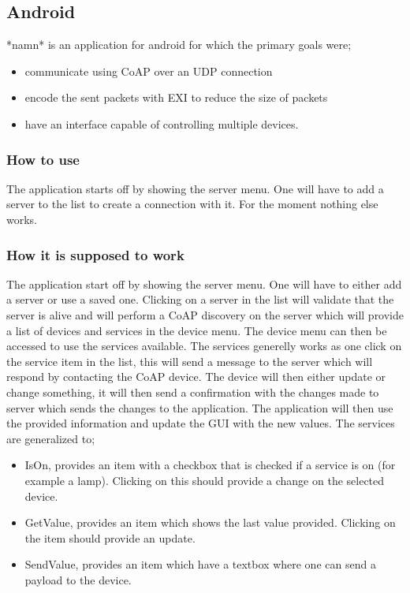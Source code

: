 \subsection{Android}
*namn* is an application for android for which the primary goals were;
\begin{itemize}
 \item communicate using CoAP over an UDP connection
 \item encode the sent packets with EXI to reduce the size of packets
 \item have an interface capable of controlling multiple devices.
\end{itemize}


\subsubsection{How to use}
The application starts off by showing the server menu. One will have to add a server to the list to create a connection with it. For the moment nothing else works.

\subsubsection{How it is supposed to work}

The application start off by showing the server menu. One will have to either add a server or use a saved one. 
Clicking on a server in the list will validate that the server is alive and will perform a CoAP discovery on the server
which will provide a list of devices and services in the device menu. The device menu can then be accessed to use the services available.
The services generelly works as one click on the service item in the list, this will send a message to the server which will respond by contacting the CoAP device. The device will then either update or change something,
it will then send a confirmation with the changes made to server which sends the changes to the application. The application will then use the provided information and update the GUI with the new values. 
The services are generalized to; 
\begin{itemize}
 \item IsOn, provides an item with a checkbox that is checked if a service is on (for example a lamp). Clicking on this should provide a change on the selected device.
 \item GetValue, provides an item which shows the last value provided. Clicking on the item should provide an update.
 \item SendValue, provides an item which have a textbox where one can send a payload to the device. %
\end{itemize}


